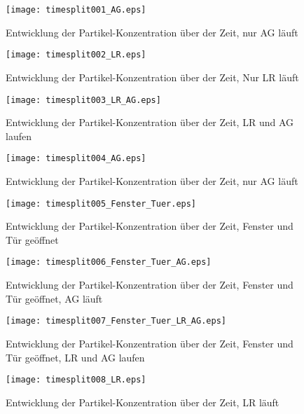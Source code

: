 \documentclass[12pt,a4paper,bibtotocnumbered,liststotocnumbered]{scrreprt}
\begin{document}
\begin{figure}[H]
\begin{minipage}[t]{0.49\textwidth}
\texttt{[image: timesplit001\_AG.eps]}
\caption{Entwicklung der Partikel-Konzentration über der Zeit, nur \acs{AG} läuft}
\label{Abb: timesplit001_AG}
\end{minipage}
\begin{minipage}[t]{0.49\textwidth}
\texttt{[image: timesplit002\_LR.eps]}
\caption{Entwicklung der Partikel-Konzentration über der Zeit, Nur \ac{LR} läuft}
\label{Abb: timesplit002_LR}
\end{minipage}
\begin{minipage}[t]{0.49\textwidth}
\texttt{[image: timesplit003\_LR\_AG.eps]}
\caption{Entwicklung der Partikel-Konzentration über der Zeit, LR und \acs{AG} laufen}
\label{Abb: timesplit003_LR_AG}
\end{minipage}
\begin{minipage}[t]{0.49\textwidth}
\texttt{[image: timesplit004\_AG.eps]}
\caption{Entwicklung der Partikel-Konzentration über der Zeit, nur \acs{AG} läuft}
\label{Abb: timesplit004_AG}
\end{minipage}
\end{figure}

\begin{figure}[H]
\begin{minipage}[t]{0.49\textwidth}
\texttt{[image: timesplit005\_Fenster\_Tuer.eps]}
\caption{Entwicklung der Partikel-Konzentration über der Zeit, Fenster und Tür geöffnet}
\label{Abb: timesplit005_Fenster_Tuer}
\end{minipage}
\begin{minipage}[t]{0.49\textwidth}
\texttt{[image: timesplit006\_Fenster\_Tuer\_AG.eps]}
\caption{Entwicklung der Partikel-Konzentration über der Zeit, Fenster und Tür geöffnet, \acs{AG} läuft}
\label{Abb: timesplit006_Fenster_Tuer_AG}
\end{minipage}
\begin{minipage}[t]{0.49\textwidth}
\texttt{[image: timesplit007\_Fenster\_Tuer\_LR\_AG.eps]}
\caption{Entwicklung der Partikel-Konzentration über der Zeit,  Fenster und Tür geöffnet, \ac{LR} und \acs{AG} laufen}
\label{Abb: timesplit007_Fenster_Tuer_LR_AG}
\end{minipage}
\begin{minipage}[t]{0.49\textwidth}
\texttt{[image: timesplit008\_LR.eps]}
\caption{Entwicklung der Partikel-Konzentration über der Zeit, LR läuft}
\label{Abb: timesplit008_LR}
\end{minipage}
\end{figure}
\end{document}
